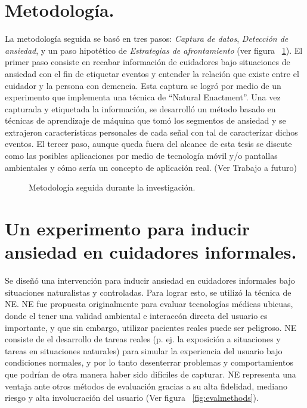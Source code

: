 \section{Metodolog\'ia.}\label{secc:methodology}
La metodolog\'ia seguida se bas\'o en tres pasos: \textit{Captura de datos}, \textit{Detecci\'on de ansiedad}, y un paso hipot\'etico de \textit{Estrategias de afrontamiento} (ver figura ~\ref{fig:metodology}). El primer paso consiste en recabar informaci\'on de cuidadores bajo situaciones de ansiedad con el fin de etiquetar eventos y entender la relaci\'on que existe entre el cuidador y la persona con demencia. Esta captura se logr\'o por medio de un experimento que implementa una t\'ecnica de ``Natural Enactment''. Una vez capturada y etiquetada la informaci\'on, se desarroll\'o un m\'etodo basado en t\'ecnicas de aprendizaje de m\'aquina que tom\'o los segmentos de ansiedad y se extrajeron caracter\'isticas personales de cada se\~nal con tal de caracter\'izar dichos eventos. El tercer paso, aunque queda fuera del alcance de esta tesis se discute como las posibles aplicaciones por medio de tecnolog\'ia m\'ovil y/o pantallas ambientales y c\'omo ser\'ia un concepto de aplicaci\'on real. (Ver Trabajo a futuro)
\begin{figure}[h]
        \centering
        \caption{Metodolog\'ia seguida durante la investigaci\'on.} \label{fig:metodology}
\end{figure}

\section{Un experimento para inducir ansiedad en cuidadores informales.}\label{secc:experiment}
Se dise\~n\'o una intervenci\'on para inducir ansiedad en cuidadores informales bajo situaciones naturalistas y controladas. Para lograr esto, se utiliz\'o la t\'ecnica de NE. NE fue propuesta originalmente para evaluar tecnolog\'ias m\'edicas ubicuas, donde el tener una validad ambiental e interacc\'on directa del usuario es importante, y que sin embargo, utilizar pacientes reales puede ser peligroso\cite{Castro11}. NE consiste de el desarrollo de tareas reales (p. ej. la exposici\'on a situaciones y tareas en situaciones naturales) para simular la experiencia del usuario bajo condiciones normales, y por lo tanto desenterrar problemas y comportamientos que podr\'ian de otra manera haber sido dif\'iciles de capturar. NE representa una ventaja ante otros m\'etodos de evaluaci\'on gracias a su alta fidelidad, mediano riesgo y alta involucraci\'on del usuario (Ver figura ~\ref{fig:evalmethods}).

